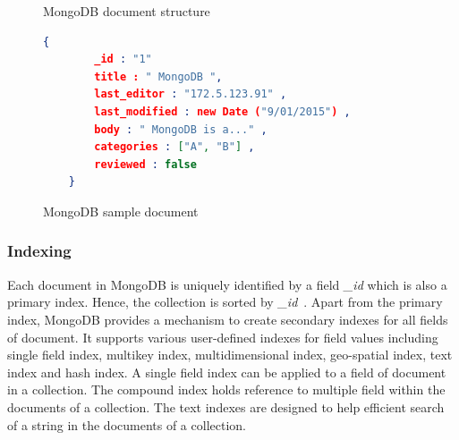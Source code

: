 \begin{figure}[h]
	\centering
	\centering
	\caption{MongoDB document structure~\citep{mongodb:org}}
	\label{fig:mongodb-doc}
	
\end{figure}

	\begin{figure}[h]
	\begin{lstlisting}[language=JSON,basicstyle=\scriptsize]
	{
		_id : "1"
		title : " MongoDB ",
		last_editor : "172.5.123.91" ,
		last_modified : new Date ("9/01/2015") ,
		body : " MongoDB is a..." ,
		categories : ["A", "B"] ,
		reviewed : false
	}
	\end{lstlisting} 
	\caption{MongoDB sample document}
	\label{sample-mongodb-document}
\end{figure}

\subsubsection{Indexing}\label{mong-xmark-indexing}

Each document in MongoDB is uniquely identified by a field \textit{\_id} which is also a primary index. Hence, the collection is sorted by \textit{\_id}~\citep{nosql/comparision}.
Apart from the primary index, MongoDB provides a mechanism to create secondary indexes for all fields of document. It supports various user-defined indexes for field values including single field index, multikey index, multidimensional index, geo-spatial index, text index and hash index. A single field index  can be applied to a field of document in a collection.  The compound index holds reference to multiple field within the documents of a collection. The text indexes are designed to help efficient search of a string in the documents of a collection.

